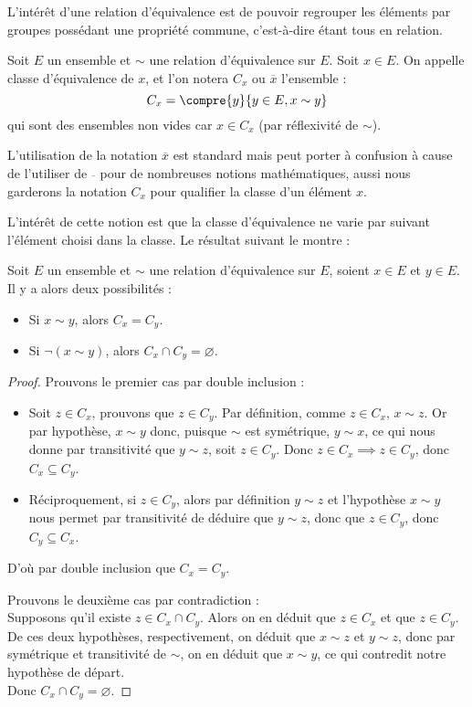 L'intérêt d'une relation d'équivalence est de pouvoir regrouper les éléments par groupes possédant une propriété commune, c'est-à-dire étant tous en relation.

\begin{defi}
    Soit $E$ un ensemble et $\sim$ une relation d'équivalence sur $E$. Soit $x\in E$. On appelle classe d'équivalence de $x$, et l'on notera $C_x$ ou $\overline x$ l'ensemble : $$C_x = \compre{y}{y\in E, x\sim y}$$ qui sont des ensembles non vides car $x\in C_x$ (par réflexivité de $\sim$).
    
    L'utilisation de la notation $\overline x$ est standard mais peut porter à confusion à cause de l'utiliser de $\overline{}$ pour de nombreuses notions mathématiques, aussi nous garderons la notation $C_x$ pour qualifier la classe d'un élément $x$.
\end{defi}

L'intérêt de cette notion est que la classe d'équivalence ne varie par suivant l'élément choisi dans la classe. Le résultat suivant le montre :

\begin{prop} \label{sim:disjonction}
    Soit $E$ un ensemble et $\sim$ une relation d'équivalence sur $E$, soient $x\in E$ et $y\in E$. Il y a alors deux possibilités :
    \begin{itemize}[label=$\bullet$]
        \item Si $x\sim y$, alors $C_x=C_y$.
        \item Si $\lnot (x\sim y)$, alors $C_x\cap C_y = \varnothing$.
    \end{itemize}
\end{prop}

\begin{proof}
    Prouvons le premier cas par double inclusion :
    \begin{itemize}[label=]
        \item Soit $z\in C_x$, prouvons que $z\in C_y$. Par définition, comme $z\in C_x$, $x\sim z$. Or par hypothèse, $x\sim y$ donc, puisque $\sim$ est symétrique, $y\sim x$, ce qui nous donne par transitivité que $y\sim z$, soit $z\in C_y$. Donc $z\in C_x\implies z\in C_y$, donc \underline{$C_x\subseteq C_y$}.
        \item Réciproquement, si $z\in C_y$, alors par définition $y\sim z$ et l'hypothèse $x\sim y$ nous permet par transitivité de déduire que $y\sim z$, donc que $z\in C_y$, donc \underline{$C_y\subseteq C_x$}.
    \end{itemize}
    D'où par double inclusion que $\boxed{C_x=C_y}$.
    
    \vspace{0.25cm}
    Prouvons le deuxième cas par contradiction :\\
    Supposons qu'il existe $z\in C_x\cap C_y$. Alors on en déduit que $z\in C_x$ et que $z\in C_y$. De ces deux hypothèses, respectivement, on déduit que $x\sim z$ et $y\sim z$, donc par symétrique et transitivité de $\sim$, on en déduit que \underline{$x\sim y$}, ce qui contredit notre hypothèse de départ.\\
    Donc $\boxed{C_x\cap C_y = \varnothing}$.
\end{proof}


